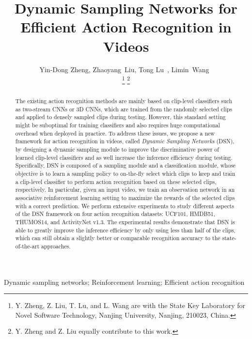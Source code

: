 \documentclass[journal]{IEEEtran}
\begin{document}
\title{Dynamic Sampling Networks for Efficient Action Recognition in Videos}


\author{Yin-Dong Zheng,
        Zhaoyang~Liu,
        Tong Lu~,
        Limin~Wang~



\thanks{Y. Zheng, Z. Liu, T. Lu, and L. Wang are with the State Key Laboratory for Novel Software Technology, Nanjing University, Nanjing, 210023, China.}
\thanks{Y. Zheng and Z. Liu equally contribute to this work.}
}




\maketitle

\begin{abstract}
The existing action recognition methods are mainly based on clip-level classifiers such as two-stream CNNs or 3D CNNs, which are trained from the randomly selected clips and applied to densely sampled clips during testing.
However, this standard setting might be suboptimal for training classifiers and also requires huge computational overhead when deployed in practice.
To address these issues, we propose a new framework for action recognition in videos, called {\em Dynamic Sampling Networks} (DSN), by designing a dynamic sampling module to improve the discriminative power of learned clip-level classifiers and as well increase the inference efficiency during testing.
Specifically, DSN is composed of a sampling module and a classification module, whose objective is to learn a sampling policy to on-the-fly select which clips to keep and train a clip-level classifier to perform action recognition based on these selected clips, respectively.
In particular, given an input video, we train an observation network in an associative reinforcement learning setting to maximize the rewards of the selected clips with a correct prediction.
We perform extensive experiments to study different aspects of the DSN framework on four action recognition datasets: UCF101, HMDB51, THUMOS14, and ActivityNet v1.3.
The experimental results demonstrate that DSN is able to greatly improve the inference efficiency by only using less than half of the clips, which can still obtain a slightly better or comparable recognition accuracy to the state-of-the-art approaches.
\end{abstract}

\begin{IEEEkeywords}
 Dynamic sampling networks; Reinforcement learning; Efficient action recognition
\end{IEEEkeywords}
\end{document}
